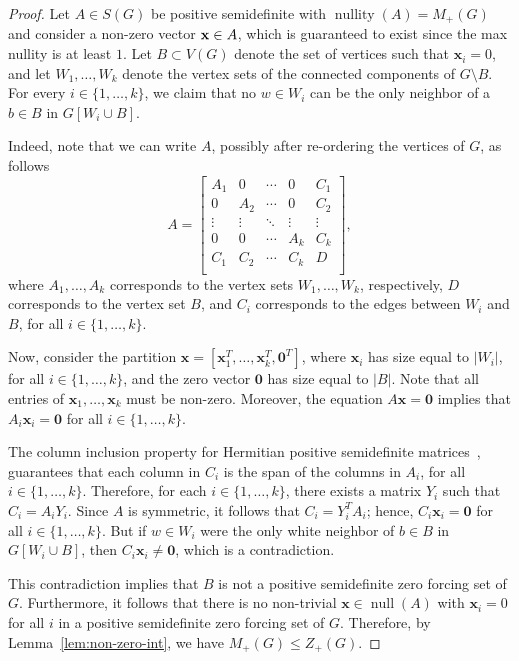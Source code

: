 \documentclass{article}
\theoremstyle{definition}
\newcommand\abs[1]{\left|#1\right|}
\newcommand\nullity[1]{\operatorname{nullity}\left(#1\right)}
\newcommand\kernel[1]{\operatorname{null}\left(#1\right)}
\begin{document}
\begin{proof}
Let $A\in S(G)$ be positive semidefinite with $\nullity{A}=M_{+}(G)$ and consider a non-zero vector $\textbf{x}\in\null{A}$, which is guaranteed to exist since the max nullity is at least $1$.
Let $B\subset V(G)$ denote the set of vertices such that $\textbf{x}_{i}=0$, and let $W_{1},\ldots,W_{k}$ denote the vertex sets of the connected components of $G\setminus{B}$.
For every $i\in\{1,\ldots,k\}$, we claim that no $w\in W_{i}$ can be the only neighbor of a $b\in B$ in $G[W_{i}\cup B]$.

Indeed, note that we can write $A$, possibly after re-ordering the vertices of $G$, as follows 
\[
A = \begin{bmatrix}
		A_{1} & 0 & \cdots & 0 & C_{1} \\
		0 & A_{2} & \cdots & 0 & C_{2} \\
		\vdots & \vdots & \ddots & \vdots & \vdots \\
		0 & 0 & \cdots & A_{k} & C_{k} \\
		C_{1} & C_{2} & \cdots & C_{k} & D \\
		\end{bmatrix},
\]
where $A_{1},\ldots,A_{k}$ corresponds to the vertex sets $W_{1},\ldots,W_{k}$, respectively, $D$ corresponds to the vertex set $B$, and $C_{i}$ corresponds to the edges between $W_{i}$ and $B$, for all $i\in\{1,\ldots,k\}$.

Now, consider the partition $\textbf{x} = [\textbf{x}_{1}^{T},\ldots,\textbf{x}_{k}^{T},\textbf{0}^{T}]$, where $\textbf{x}_{i}$ has size equal to $\abs{W_{i}}$, for all $i\in\{1,\ldots,k\}$, and the zero vector $\textbf{0}$ has size equal to $\abs{B}$.
Note that all entries of $\textbf{x}_{1},\ldots,\textbf{x}_{k}$ must be non-zero.
Moreover, the equation $A\textbf{x}=\textbf{0}$ implies that $A_{i}\textbf{x}_{i}=\textbf{0}$ for all $i\in\{1,\ldots,k\}$.

The column inclusion property for Hermitian positive semidefinite matrices~\cite{Johnson1998}, guarantees that each column in $C_{i}$ is the span of the columns in $A_{i}$, for all $i\in\{1,\ldots,k\}$.
Therefore, for each $i\in\{1,\ldots,k\}$, there exists a matrix $Y_{i}$ such that $C_{i}=A_{i}Y_{i}$.
Since $A$ is symmetric, it follows that $C_{i}=Y_{i}^{T}A_{i}$; hence, $C_{i}\textbf{x}_{i}=\textbf{0}$ for all $i\in\{1,\ldots,k\}$.
But if $w\in W_{i}$ were the only white neighbor of $b\in B$ in $G[W_{i}\cup B]$, then $C_{i}\textbf{x}_{i}\neq \textbf{0}$, which is a contradiction. 

This contradiction implies that $B$ is not a positive semidefinite zero forcing set of $G$.
Furthermore, it follows that there is no non-trivial $\textbf{x}\in\kernel{A}$ with $\textbf{x}_{i}=0$ for all $i$ in a positive semidefinite zero forcing set of $G$.
Therefore, by Lemma~\ref{lem:non-zero-int}, we have $M_{+}(G)\leq Z_{+}(G)$.
\end{proof}
\end{document}
